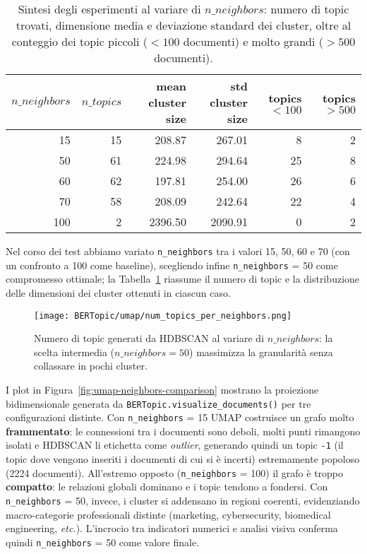 \begin{table}[H]
\centering
\footnotesize
\begin{tabular}{rrrrrr}
\hline
$n\_neighbors$ & $n\_topics$ & mean cluster size & std cluster size & topics $<100$ & topics $>500$ \\
\hline
15  & 15 & 208.87 & 267.01 & 8  & 2 \\
50  & 61 & 224.98 & 294.64 & 25 & 8 \\
60  & 62 & 197.81 & 254.00 & 26 & 6 \\
70  & 58 & 208.09 & 242.64 & 22 & 4 \\
100 & 2  & 2396.50 & 2090.91 & 0  & 2 \\
\hline
\end{tabular}
\caption{Sintesi degli esperimenti al variare di $n\_neighbors$: numero di topic trovati, dimensione media e deviazione standard dei cluster, oltre al conteggio dei topic piccoli ($<100$ documenti) e molto grandi ($>500$ documenti).}
\label{tab:n-neighbors-summary}
\end{table}

\noindent Nel corso dei test abbiamo variato \texttt{n\_neighbors} tra i valori 15, 50, 60 e 70 (con un confronto a 100 come baseline), scegliendo infine \texttt{n\_neighbors} = 50 come compromesso ottimale; la Tabella~\ref{tab:n-neighbors-summary} riassume il numero di topic e la distribuzione delle dimensioni dei cluster ottenuti in ciascun caso.

\begin{figure}[H]
\centering
\texttt{[image: BERTopic/umap/num\_topics\_per\_neighbors.png]}
\caption{Numero di topic generati da HDBSCAN al variare di $n\_neighbors$: la scelta intermedia ($n\_neighbors=50$) massimizza la granularità senza collassare in pochi cluster.}
\label{fig:num-topics-per-neighbors}
\end{figure}
\noindent I plot in Figura~\ref{fig:umap-neighbors-comparison} mostrano la proiezione bidimensionale generata da \texttt{BERTopic.\allowbreak visualize\_documents()} per tre configurazioni distinte. Con \texttt{n\_neighbors} = 15 UMAP costruisce un grafo molto \textbf{frammentato}: le connessioni tra i documenti sono deboli, molti punti rimangono isolati e HDBSCAN li etichetta come \textit{outlier}, generando quindi un topic \texttt{-1} (il topic dove vengono inseriti i documenti di cui si è incerti) estremamente popoloso (2224 documenti). All'estremo opposto (\texttt{n\_neighbors} = 100) il grafo è troppo \textbf{compatto}: le relazioni globali dominano e i topic tendono a fondersi. Con \texttt{n\_neighbors} = 50, invece, i cluster si addensano in regioni coerenti, evidenziando macro-categorie professionali distinte (marketing, cybersecurity, biomedical engineering, \emph{etc.}). L'incrocio tra indicatori numerici e analisi visiva conferma quindi \texttt{n\_neighbors} = 50 come valore finale.

